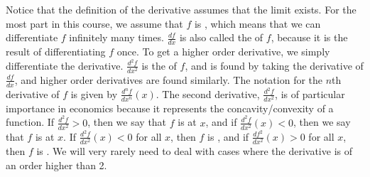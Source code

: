 Notice that the definition of the derivative assumes that the limit exists. For the most part in this course, we assume that $f$ is , which means that we can differentiate $f$ infinitely many times. $\frac{df}{dx}$ is also called the  of $f$, because it is the result of differentiating $f$ once. To get a higher order derivative, we simply differentiate the derivative. $\frac{d^2f}{dx^2}$ is the  of $f$, and is found by taking the derivative of $\frac{df}{dx}$, and higher order derivatives are found similarly. The notation for the $n$th derivative of $f$ is given by $\frac{d^nf}{dx^n}(x)$. The second derivative, $\frac{d^2f}{dx^2}$, is of particular importance in economics because it represents the concavity/convexity of a function. If $\frac{d^2f}{dx^2} > 0$, then we say that $f$ is  at $x$, and if $\frac{d^2f}{dx^2}(x) < 0$, then we say that $f$ is  at $x$. If $\frac{d^2f}{dx^2}(x) < 0$ for all $x$, then $f$ is , and if $\frac{df^2}{dx^2}(x) > 0$ for all $x$, then $f$ is . We will very rarely need to deal with cases where the derivative is of an order higher than 2.

